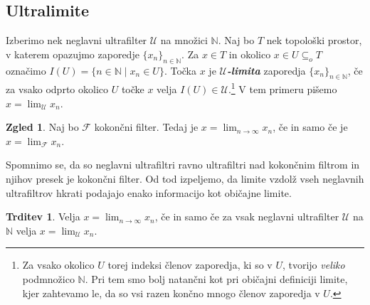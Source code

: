 \documentclass[11pt]{book}
\def\NN{\mathbb{N}}
\def\FF{\mathcal{F}}
\def\UU{\mathcal{U}}
\def\definicija{\color{rdeca}\bf\em}
\theoremstyle{definition}
\theoremstyle{zgled}
\newtheorem*{zgled}{Zgled}
\theoremstyle{odprtproblem}
\theoremstyle{domacanaloga}
\theoremstyle{izrek}
\newtheorem*{trditev}{Trditev}
\begin{document}



\subsection{Ultralimite}

Izberimo nek neglavni ultrafilter $\UU$ na množici $\NN$. Naj bo $T$ nek topološki prostor, v katerem opazujmo zaporedje $\{ x_n \}_{n \in \NN}$. Za $x \in T$ in okolico $x \in U \subseteq_o T$ označimo $I(U) = \{ n \in \NN \mid x_n \in U \}$. Točka $x$ je {\definicija $\UU$-limita} zaporedja $\{ x_n \}_{n \in \NN}$, če za vsako odprto okolico $U$ točke $x$ velja $I(U) \in \UU$.\footnote{Za vsako okolico $U$ torej indeksi členov zaporedja, ki so v $U$, tvorijo {\em veliko} podmnožico $\NN$. Pri tem smo bolj natančni kot pri običajni definiciji limite, kjer zahtevamo le, da so vsi razen končno mnogo členov zaporedja v $U$.} V tem primeru pišemo $x = \lim_{\UU} x_n$.

\begin{zgled}
Naj bo $\FF$ kokončni filter. Tedaj je $x = \lim_{n \to \infty} x_n$, če in samo če je $x = \lim_{\FF} x_n$.
\end{zgled}

Spomnimo se, da so neglavni ultrafiltri ravno ultrafiltri nad kokončnim filtrom in njihov presek je kokončni filter. Od tod izpeljemo, da limite vzdolž vseh neglavnih ultrafiltrov hkrati podajajo enako informacijo kot običajne limite. 

\begin{trditev}
Velja $x = \lim_{n \to \infty} x_n$, če in samo če za vsak neglavni ultrafilter $\UU$ na $\NN$ velja $x = \lim_{\UU} x_n$.
\end{trditev}
\end{document}
